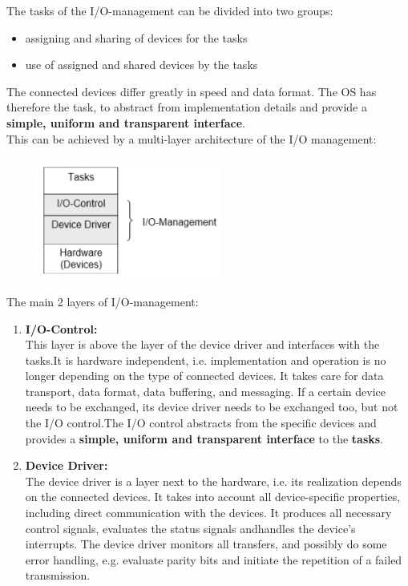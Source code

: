 The tasks of the I/O-management can be divided into two groups:

\begin{itemize}
\item  assigning and sharing of devices for the tasks
\item  use of assigned and shared devices by the tasks
\end{itemize}

The connected devices differ greatly in speed and data format. The OS has therefore the task, to abstract from implementation details and provide a \textbf{simple, uniform and transparent interface}. \\

This can be achieved by a multi-layer architecture of the I/O management:

 	\begin{figure}[h]
    \centering
    \includegraphics[width=6cm, height=4cm]{Images/image189.png}
    \label{fig:Fig }
    \end{figure}
    
The main 2 layers of I/O-management:

\begin{enumerate}
\item  \textbf{I/O-Control: }\\This layer is above the layer of the device driver and interfaces with the tasks.It is hardware independent, i.e. implementation and operation is no longer depending on the type of connected devices. It takes care for data transport, data format, data buffering, and messaging. If a certain device needs to be exchanged, its device driver needs to be exchanged too, but not the I/O control.The I/O control abstracts from the specific devices and provides a \textbf{simple, uniform and transparent interface} to the \textbf{tasks}.

\item   \textbf{Device Driver:}\\The device driver is a layer next to the hardware, i.e. its realization depends on the connected devices. It takes into account all device-specific properties, including direct communication with the devices. It produces all necessary control signals, evaluates the status signals andhandles the device's interrupts. The device driver monitors all transfers, and possibly do some error handling, e.g. evaluate parity bits and initiate the repetition of a failed transmission.
\end{enumerate}

